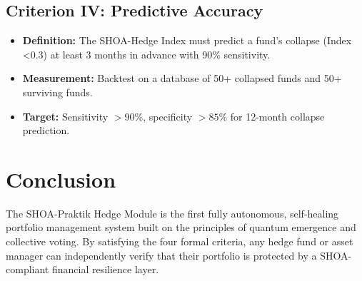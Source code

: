 \documentclass[12pt]{article}
\begin{document}
\subsection{Criterion IV: Predictive Accuracy}
\begin{itemize}
    \item \textbf{Definition:} The SHOA-Hedge Index must predict a fund's collapse (Index <0.3) at least 3 months in advance with 90\% sensitivity.
    \item \textbf{Measurement:} Backtest on a database of 50+ collapsed funds and 50+ surviving funds.
    \item \textbf{Target:} Sensitivity $> 90\%$, specificity $> 85\%$ for 12-month collapse prediction.
\end{itemize}

\section{Conclusion}
The SHOA-Praktik Hedge Module is the first fully autonomous, self-healing portfolio management system built on the principles of quantum emergence and collective voting. By satisfying the four formal criteria, any hedge fund or asset manager can independently verify that their portfolio is protected by a SHOA-compliant financial resilience layer.
\end{document}
